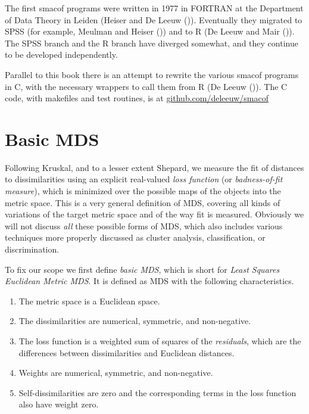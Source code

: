 \documentclass[
  12pt,
  letterpaper,
  DIV=11,
  numbers=noendperiod]{scrreprt}
\providecommand{\tightlist}{%
  \setlength{\itemsep}{0pt}\setlength{\parskip}{0pt}}\usepackage{longtable,booktabs,array}
\theoremstyle{remark}
\begin{document}
The first smacof programs were written in 1977 in FORTRAN at the
Department of Data Theory in Leiden (Heiser and De Leeuw
()). Eventually they migrated to
SPSS (for example, Meulman and Heiser
()) and to R (De Leeuw and Mair
()). The SPSS branch and the R
branch have diverged somewhat, and they continue to be developed
independently.

Parallel to this book there is an attempt to rewrite the various smacof
programs in C, with the necessary wrappers to call them from R (De Leeuw
()). The C code, with makefiles and
test routines, is at
\href{https://github.com/deleeuw/smacof}{github.com/deleeuw/smacof}

\section{Basic MDS}\label{introbasic}

Following Kruskal, and to a lesser extent Shepard, we measure the fit of
distances to dissimilarities using an explicit real-valued \emph{loss
function} (or \emph{badness-of-fit measure}), which is minimized over
the possible maps of the objects into the metric space. This is a very
general definition of MDS, covering all kinds of variations of the
target metric space and of the way fit is measured. Obviously we will
not discuss \emph{all} these possible forms of MDS, which also includes
various techniques more properly discussed as cluster analysis,
classification, or discrimination.

To fix our scope we first define \emph{basic MDS}, which is short for
\emph{Least Squares Euclidean Metric MDS}. It is defined as MDS with the
following characteristics.

\begin{enumerate}
\def\labelenumi{\arabic{enumi}.}
\tightlist
\item
  The metric space is a Euclidean space.
\item
  The dissimilarities are numerical, symmetric, and non-negative.
\item
  The loss function is a weighted sum of squares of the
  \emph{residuals}, which are the differences between dissimilarities
  and Euclidean distances.
\item
  Weights are numerical, symmetric, and non-negative.
\item
  Self-dissimilarities are zero and the corresponding terms in the loss
  function also have weight zero.
\end{enumerate}
\end{document}
